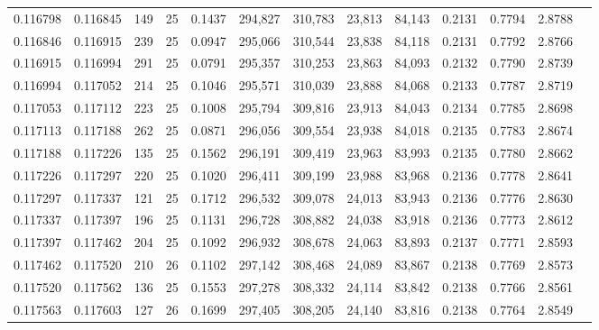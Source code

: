 \begin{tabular}{rrrrrrrrrrrrr}
0.116798 & 0.116845 &   149 &  25 &                                     0.1437 & 294,827 & 310,783 &  23,813 &  84,143 & 0.2131 & 0.7794 & 2.8788 \\
0.116846 & 0.116915 &   239 &  25 &                                     0.0947 & 295,066 & 310,544 &  23,838 &  84,118 & 0.2131 & 0.7792 & 2.8766 \\
0.116915 & 0.116994 &   291 &  25 &                                     0.0791 & 295,357 & 310,253 &  23,863 &  84,093 & 0.2132 & 0.7790 & 2.8739 \\
0.116994 & 0.117052 &   214 &  25 &                                     0.1046 & 295,571 & 310,039 &  23,888 &  84,068 & 0.2133 & 0.7787 & 2.8719 \\
0.117053 & 0.117112 &   223 &  25 &                                     0.1008 & 295,794 & 309,816 &  23,913 &  84,043 & 0.2134 & 0.7785 & 2.8698 \\
0.117113 & 0.117188 &   262 &  25 &                                     0.0871 & 296,056 & 309,554 &  23,938 &  84,018 & 0.2135 & 0.7783 & 2.8674 \\
0.117188 & 0.117226 &   135 &  25 &                                     0.1562 & 296,191 & 309,419 &  23,963 &  83,993 & 0.2135 & 0.7780 & 2.8662 \\
0.117226 & 0.117297 &   220 &  25 &                                     0.1020 & 296,411 & 309,199 &  23,988 &  83,968 & 0.2136 & 0.7778 & 2.8641 \\
0.117297 & 0.117337 &   121 &  25 &                                     0.1712 & 296,532 & 309,078 &  24,013 &  83,943 & 0.2136 & 0.7776 & 2.8630 \\
0.117337 & 0.117397 &   196 &  25 &                                     0.1131 & 296,728 & 308,882 &  24,038 &  83,918 & 0.2136 & 0.7773 & 2.8612 \\
0.117397 & 0.117462 &   204 &  25 &                                     0.1092 & 296,932 & 308,678 &  24,063 &  83,893 & 0.2137 & 0.7771 & 2.8593 \\
0.117462 & 0.117520 &   210 &  26 &                                     0.1102 & 297,142 & 308,468 &  24,089 &  83,867 & 0.2138 & 0.7769 & 2.8573 \\
0.117520 & 0.117562 &   136 &  25 &                                     0.1553 & 297,278 & 308,332 &  24,114 &  83,842 & 0.2138 & 0.7766 & 2.8561 \\
0.117563 & 0.117603 &   127 &  26 &                                     0.1699 & 297,405 & 308,205 &  24,140 &  83,816 & 0.2138 & 0.7764 & 2.8549 \\

\end{tabular}
